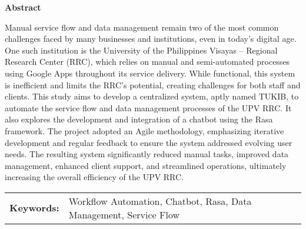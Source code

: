 \begin{center}
\textbf{Abstract}
\end{center}
\setlength{\parindent}{0pt}
Manual service flow and data management remain two of the most common challenges faced by many businesses and institutions, even in today’s digital age. One such institution is the University of the Philippines Visayas – Regional Research Center (RRC), which relies on manual and semi-automated processes using Google Apps throughout its service delivery. While functional, this system is inefficient and limits the RRC’s potential, creating challenges for both staff and clients. This study aims to develop a centralized system, aptly named TUKIB, to automate the service flow and data management processes of the UPV RRC. It also explores the development and integration of a chatbot using the Rasa framework. The project adopted an Agile methodology, emphasizing iterative development and regular feedback to ensure the system addressed evolving user needs. The resulting system significantly reduced manual tasks, improved data management, enhanced client support, and streamlined operations, ultimately increasing the overall efficiency of the UPV RRC.

\begin{tabular}{lp{4.25in}}
\hspace{-0.5em}\textbf{Keywords:}\hspace{0.25em} & Workflow Automation, Chatbot, Rasa, Data Management, Service Flow\\
\end{tabular}